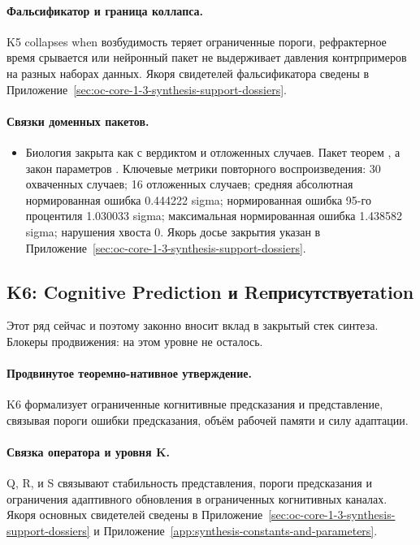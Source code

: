 \paragraph{Фальсификатор и граница коллапса.}
K5 collapses when возбудимость теряет ограниченные пороги, рефрактерное время срывается или нейронный пакет не выдерживает давления контрпримеров на разных наборах данных.
Якоря свидетелей фальсификатора сведены в Приложение~\ref{sec:oc-core-1-3-synthesis-support-dossiers}.

\paragraph{Связки доменных пакетов.}
\begin{itemize}[leftmargin=1.6em,nosep]
\item Биология закрыта как  с вердиктом  и  отложенных случаев. Пакет теорем , а закон параметров . Ключевые метрики повторного воспроизведения: 30 охваченных случаев; 16 отложенных случаев; средняя абсолютная нормированная ошибка 0.444222 sigma; нормированная ошибка 95-го процентиля 1.030033 sigma; максимальная нормированная ошибка 1.438582 sigma; нарушения хвоста 0. Якорь досье закрытия указан в Приложение~\ref{sec:oc-core-1-3-synthesis-support-dossiers}.
\end{itemize}

\subsection{K6: Cognitive Prediction и Reприсутствуетation}
\label{sec:oc-core-1-3-synthesis-k6}
Этот ряд сейчас  и поэтому законно вносит вклад в закрытый стек синтеза.
Блокеры продвижения: на этом уровне не осталось.

\paragraph{Продвинутое теоремно-нативное утверждение.}
K6 формализует ограниченные когнитивные предсказания и представление, связывая пороги ошибки предсказания, объём рабочей памяти и силу адаптации.

\paragraph{Связка оператора и уровня K.}
Q, R, и S связывают стабильность представления, пороги предсказания и ограничения адаптивного обновления в ограниченных когнитивных каналах.
Якоря основных свидетелей сведены в Приложение~\ref{sec:oc-core-1-3-synthesis-support-dossiers} и Приложение~\ref{app:synthesis-constants-and-parameters}.

